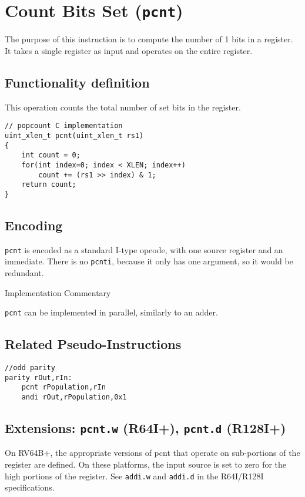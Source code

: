 \section{Count Bits Set (\texttt{pcnt})}

The purpose of this instruction is to compute the number of 1 bits in a
register. It takes a single register as input and operates on the entire
register.

\subsection{Functionality definition}

This operation counts the total number of set bits in the register.

\begin{verbatim}
// popcount C implementation
uint_xlen_t pcnt(uint_xlen_t rs1)
{
    int count = 0;
    for(int index=0; index < XLEN; index++)
        count += (rs1 >> index) & 1;
    return count;
}
\end{verbatim}

\subsection{Encoding}



\texttt{pcnt} is encoded as a standard I-type opcode, with one source
register and an immediate. There is no \texttt{pcnti}, because it only
has one argument, so it would be redundant.

Implementation Commentary

\texttt{pcnt} can be implemented in parallel, similarly to an adder.

\subsection{Related Pseudo-Instructions}

\begin{verbatim}
//odd parity
parity rOut,rIn:
    pcnt rPopulation,rIn
    andi rOut,rPopulation,0x1
\end{verbatim}

\subsection{Extensions: \texttt{pcnt.w} (R64I+), \texttt{pcnt.d} (R128I+)}

On RV64B+, the appropriate versions of pcnt that operate on sub-portions
of the register are defined. On these platforms, the input source is set
to zero for the high portions of the register. See \texttt{addi.w} and
\texttt{addi.d} in the R64I/R128I specifications.

